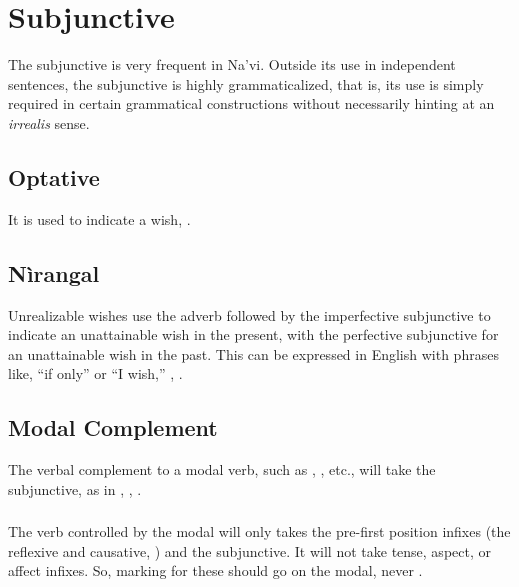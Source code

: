 \section{Subjunctive}
\noindent The subjunctive is very frequent in Na'vi.  Outside its use in
independent sentences, the sub\-junct\-ive is highly grammaticalized, that
is, its use is simply required in certain grammatical constructions
without necessarily hinting at an \textit{irrealis} sense.

\subsection{Optative} It is used to indicate a wish,  .

\subsection{Nìrangal} Unrealizable wishes use the adverb 
followed by the imperfective sub\-junc\-tive to indicate an unattainable
wish in the present, with the perfective subjunctive for an
unattainable wish in the past.  This can be expressed in English with
phrases like, ``if only'' or ``I wish,''  ,
 .

\subsection{Modal Complement} 
The verbal complement to a modal verb, such as  ,
 , etc., will take the subjunctive, as in  ,  ,  . \label{syn:modals}


\subsubsection{} \label{syn:modal-syntax} The verb controlled by the
modal will only takes the pre-first position infixes (the reflexive
and causative, ) and the subjunctive.  It
will not take tense, aspect, or affect infixes.  So, marking for these
should go on the modal,  
never . 

